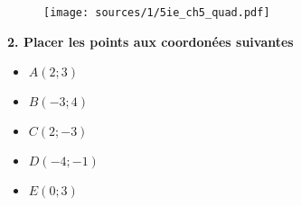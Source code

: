 \documentclass[10pt]{article}
\begin{document}
\begin{multicols}{2}
  \begin{figure}[H]
    \centering
    \texttt{[image: sources/1/5ie\_ch5\_quad.pdf]}
  \end{figure}    

  \textbf{2. Placer les points aux coordonées suivantes}

  \begin{itemize}
  \item $A(2  ;  3)$
  \item $B(-3 ;  4)$
  \item $C(2  ; -3)$
  \item $D(-4 ; -1)$
  \item $E(0  ;  3)$
  \end{itemize}

\end{multicols}
\end{document}
